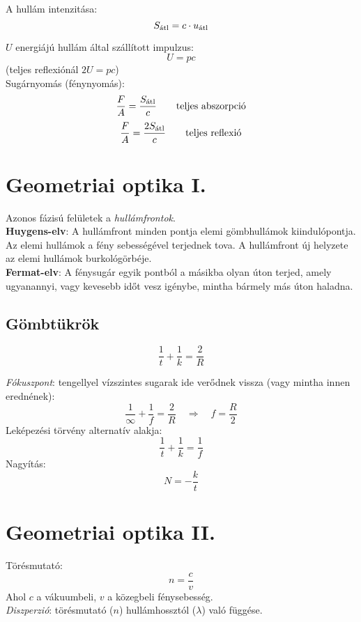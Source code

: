 \documentclass[12pt,a4paper,twocolumn]{article}
\begin{document}
  A hullám intenzitása:
  \[S_{\hbox{\scriptsize átl}} = c\cdot u_{\hbox{\scriptsize átl}}\]

  $U$ energiájú hullám által szállított impulzus:
  \[U = pc\]
  (teljes reflexiónál $2U = pc$)\\

  Sugárnyomás (fénynyomás):
  \[\frac{F}{A} = \frac{S_{\hbox{\scriptsize átl}}}{c} \qquad \hbox{teljes abszorpció}\]
  \[\frac{F}{A} = \frac{2S_{\hbox{\scriptsize átl}}}{c} \qquad \hbox{teljes reflexió}\]

  \section{Geometriai optika I.}

  Azonos fázisú felületek a \textit{hullámfrontok}.\\
 
  \textbf{Huygens-elv}: A hullámfront minden pontja elemi gömbhullámok kiindulópontja. Az elemi hullámok
  a fény sebességével terjednek tova. A hullámfront új helyzete az elemi hullámok burkológörbéje.\\

  \textbf{Fermat-elv}: A fénysugár egyik pontból a másikba olyan úton terjed, amely ugyanannyi, vagy kevesebb
  időt vesz igénybe, mintha bármely más úton haladna.

  \subsection{Gömbtükrök}

  \[\frac{1}{t} + \frac{1}{k} = \frac{2}{R}\]

  \textit{Fókuszpont}: tengellyel vízszintes sugarak ide verődnek vissza (vagy mintha innen erednének):
  \[\frac{1}{\infty} + \frac{1}{f} = \frac{2}{R} \quad \Rightarrow \quad f = \frac{R}{2}\]
  Leképezési törvény alternatív alakja:
  \[\frac{1}{t} + \frac{1}{k} = \frac{1}{f}\]
  Nagyítás:
  \[N = -\frac{k}{t}\]

  \section{Geometriai optika II.}

  Törésmutató:
  \[n = \frac{c}{v}\]
  Ahol $c$ a vákuumbeli, $v$ a közegbeli fénysebesség.\\

  \textit{Diszperzió}: törésmutató ($n$) hullámhossztól ($\lambda$) való függése.\\
\end{document}
